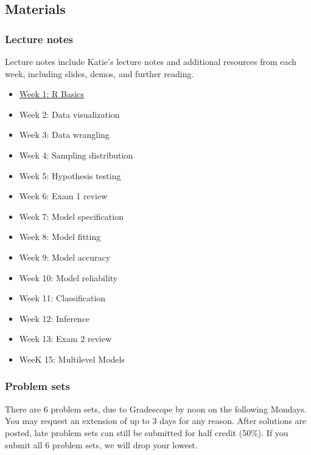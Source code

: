 \documentclass[
  letterpaper,
  DIV=11,
  numbers=noendperiod]{scrartcl}
\author{}
\date{}
\providecommand{\tightlist}{%
  \setlength{\itemsep}{0pt}\setlength{\parskip}{0pt}}\usepackage{longtable,booktabs,array}
\begin{document}
\ifdefined\Shaded\renewenvironment{Shaded}{\begin{tcolorbox}[breakable, frame hidden, sharp corners, interior hidden, boxrule=0pt, borderline west={3pt}{0pt}{shadecolor}, enhanced]}{\end{tcolorbox}}\fi

\hypertarget{materials}{%
\subsection{Materials}\label{materials}}

\hypertarget{lecture-notes}{%
\subsubsection{Lecture notes}\label{lecture-notes}}

Lecture notes include Katie's lecture notes and additional resources
from each week, including slides, demos, and further reading.

\begin{itemize}
\tightlist
\item
  \href{notes/week-01-r-basics.qmd}{Week 1: R Basics}
\item
  Week 2: Data visualization
\item
  Week 3: Data wrangling
\item
  Week 4: Sampling distribution
\item
  Week 5: Hypothesis testing
\item
  Week 6: Exam 1 review
\item
  Week 7: Model specification
\item
  Week 8: Model fitting
\item
  Week 9: Model accuracy
\item
  Week 10: Model reliability
\item
  Week 11: Classification
\item
  Week 12: Inference
\item
  Week 13: Exam 2 review
\item
  WeeK 15: Multilevel Models
\end{itemize}

\hypertarget{problem-sets}{%
\subsubsection{Problem sets}\label{problem-sets}}

There are 6 problem sets, due to Gradescope by noon on the following
Mondays. You may request an extension of up to 3 days for any reason.
After solutions are posted, late problem sets can still be submitted for
half credit (50\%). If you submit all 6 problem sets, we will drop your
lowest.
\end{document}
